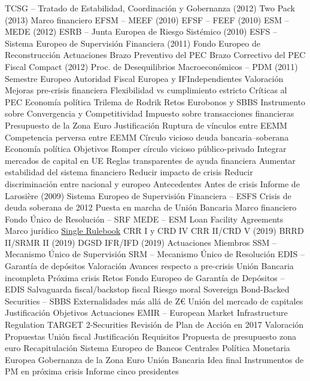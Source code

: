 \documentclass{nuevotema}
\begin{document}
\begin{esquema}[enumerate]
			\3 TCSG -- Tratado de Estabilidad, Coordinación y Gobernanza (2012) 
			\3 Two Pack (2013)
		\2 Marco financiero
			\3 EFSM -- MEEF (2010)
			\3 EFSF -- FEEF (2010)
			\3 ESM -- MEDE (2012)
			\3 ESRB -- Junta Europea de Riesgo Sistémico (2010)
			\3 ESFS -- Sistema Europeo de Supervisión Financiera (2011)
			\3 Fondo Europeo de Reconstrucción
		\2 Actuaciones
			\3 Brazo Preventivo del PEC
			\3 Brazo Correctivo del PEC
			\3 Fiscal Compact (2012)
			\3 Proc. de Desequilibrios Macroeconómicos -- PDM (2011)
			\3 Semestre Europeo
			\3 Autoridad Fiscal Europea y IFIndependientes
		\2 Valoración
			\3 Mejoras pre-crisis financiera
			\3 Flexibilidad vs cumplimiento estricto
			\3 Críticas al PEC
			\3 Economía política
			\3 Trilema de Rodrik
		\2 Retos
			\3 Eurobonos y SBBS
			\3 Instrumento sobre Convergencia y Competitividad
			\3 Impuesto sobre transacciones financieras
			\3 Presupuesto de la Zona Euro
	\1 
		\2 Justificación
			\3 Ruptura de vínculos entre EEMM
			\3 Competencia perversa entre EEMM
			\3 Círculo vicioso deuda bancaria--soberana
			\3 Economía política
		\2 Objetivos
			\3 Romper círculo vicioso público-privado
			\3 Integrar mercados de capital en UE
			\3 Reglas transparentes de ayuda financiera
			\3 Aumentar estabilidad del sistema financiero
			\3 Reducir impacto de crisis
			\3 Reducir discriminación entre nacional y europeo
		\2 Antecedentes
			\3 Antes de crisis
			\3 Informe de Larosière (2009)
			\3 Sistema Europeo de Supervisión Financiera -- ESFS
			\3 Crisis de deuda soberana de 2012
			\3 Puesta en marcha de Unión Bancaria
		\2 Marco financiero
			\3 Fondo Único de Resolución -- SRF
			\3 MEDE -- ESM
			\3 Loan Facility Agreements
		\2 Marco jurídico
			\3 \underline{Single Rulebook}
			\3 CRR I y CRD IV
			\3 CRR II/CRD V (2019)
			\3 BRRD II/SRMR II (2019)
			\3 DGSD
			\3 IFR/IFD (2019)
		\2 Actuaciones
			\3 Miembros
			\3 SSM -- Mecanismo Único de Supervisión
			\3 SRM -- Mecanismo Único de Resolución
			\3 EDIS -- Garantía de depósitos
		\2 Valoración
			\3 Avances respecto a pre-crisis
			\3 Unión Bancaria incompleta
			\3 Próxima crisis
		\2 Retos
			\3 Fondo Europeo de Garantía de Depósitos -- EDIS
			\3 Salvaguarda fiscal/backstop fiscal
			\3 Riesgo moral
			\3 Sovereign Bond-Backed Securities -- SBBS 
			\3 Externalidades más allá de Z€
	\1 
		\2 Unión del mercado de capitales
			\3 Justificación
			\3 Objetivos
			\3 Actuaciones
			\3 EMIR -- European Market Infrastructure Regulation
			\3 TARGET 2-Securities
			\3 Revisión de Plan de Acción en 2017
			\3 Valoración
			\3 Propuestas
		\2 Unión fiscal
			\3 Justificación
			\3 Requisitos
			\3 Propuesta de presupuesto zona euro
	\1[] 
		\2 Recapitulación
			\3 Sistema Europeo de Bancos Centrales
			\3 Política Monetaria Europea
			\3 Gobernanza de la Zona Euro
			\3 Unión Bancaria
		\2 Idea final
			\3 Instrumentos de PM en próxima crisis
			\3 Informe cinco presidentes

\end{esquema}
\end{document}
